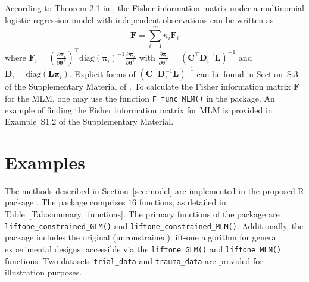 According to Theorem 2.1 in \cite{bu2020}, the Fisher information matrix under a multinomial logistic regression model with independent observations can be written as
\begin{equation}\label{eq:F_sum}
   \mathbf F = \sum_{i=1}^m n_i \mathbf F_i
\end{equation}
where $\mathbf F_i = (\frac{\partial{\boldsymbol\pi_i}}{\partial{\boldsymbol \theta^\top}})^\top \text{diag}(\boldsymbol \pi_i)^{-1}\frac{\partial \boldsymbol \pi_i}{\partial \boldsymbol \theta^\top}$ with $\frac{\partial \boldsymbol \pi_i}{\partial \boldsymbol \theta^\top} = (\mathbf C^\top \mathbf D_i^{-1} \mathbf L)^{-1}$ and $\mathbf D_i = \text{diag}(\mathbf L \boldsymbol \pi_i)$. Explicit forms of $(\mathbf C^\top \mathbf D_i^{-1} \mathbf L)^{-1}$ can be found in  Section~S.3 of the Supplementary Material of \cite{bu2020}. To calculate the Fisher information matrix $\mathbf F$ for the MLM, one may use the function \texttt{F\_func\_MLM()} in the  package. An example of finding the Fisher information matrix for MLM is provided in Example~S1.2 of the Supplementary Material.

\section{Examples}\label{sec:example}

The methods described in Section~\ref{sec:model} are implemented in the proposed R package . The  package comprises $16$ functions, as detailed in Table~\ref{Tab:summary_functions}. The primary functions of the  package are \texttt{liftone\_constrained\_GLM()} and \texttt{liftone\_constrained\_MLM()}. Additionally, the package includes the original (unconstrained) lift-one algorithm for general experimental designs, accessible via the \texttt{liftone\_GLM()} and \texttt{liftone\_MLM()} functions. Two datasets \texttt{trial\_data} and \texttt{trauma\_data} are provided for illustration purposes.

